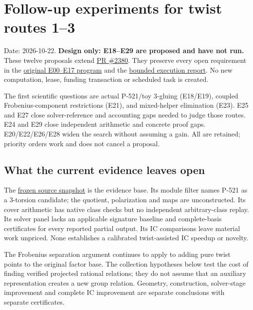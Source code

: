 \documentclass[
  10pt,
]{article}
\author{}
\date{}
\begin{document}
\section{Follow-up experiments for twist routes
1--3}\label{follow-up-experiments-for-twist-routes-13}

Date: 2026-10-22. \textbf{Design only: E18--E29 are proposed and have
not run.} These twelve proposals extend
\href{https://github.com/aburan28/crypto/pull/2380}{PR \#2380}. They
preserve every open requirement in the \href{../EXPERIMENTS.md}{original
E00--E17 program} and the \href{../reports/EXECUTION_RESULTS.md}{bounded
execution report}. No new computation, lease, funding transaction or
scheduled task is created.

The first scientific questions are actual P-521/toy 3-gluing (E18/E19),
coupled Frobenius-component restrictions (E21), and mixed-helper
elimination (E23). E25 and E27 close solver-reference and accounting
gaps needed to judge those routes. E24 and E29 close independent
arithmetic and concrete proof gaps. E20/E22/E26/E28 widen the search
without assuming a gain. All are retained; priority orders work and does
not cancel a proposal.

\subsection{What the current evidence leaves
open}\label{what-the-current-evidence-leaves-open}

The
\href{https://github.com/aburan28/crypto/tree/9dff98b15fd91887d41a73419a03abe17f9e24ca/research/twist_routes_1_3_20261021}{frozen
source snapshot} is the evidence base. Its module filter names P-521 as
a 3-torsion candidate; the quotient, polarization and maps are
unconstructed. Its cover arithmetic has native class checks but no
independent arbitrary-class replay. Its solver panel lacks an applicable
signature baseline and complete-basis certificates for every reported
partial output. Its IC comparisons leave material work unpriced. None
establishes a calibrated twist-assisted IC speedup or novelty.

The Frobenius separation argument continues to apply to adding pure
twist points to the original factor base. The collection hypotheses
below test the cost of finding verified projected rational relations;
they do not assume that an auxiliary representation creates a new group
relation. Geometry, construction, solver-stage improvement and complete
IC improvement are separate conclusions with separate certificates.
\end{document}
